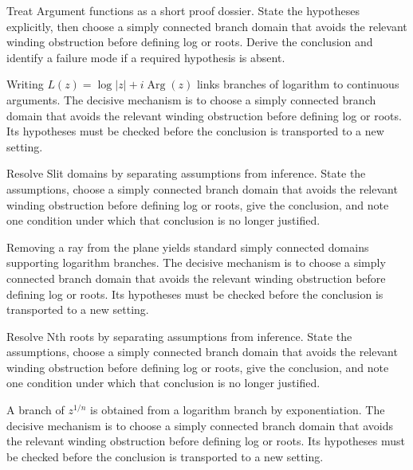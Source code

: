 \begin{problem}\label{prob:iv14-problem-03}
Treat Argument functions as a short proof dossier. State the hypotheses explicitly, then choose a simply connected branch domain that avoids the relevant winding obstruction before defining log or roots. Derive the conclusion and identify a failure mode if a required hypothesis is absent.
\end{problem}
\begin{solution}
Writing $L(z)=\log|z|+i\operatorname{Arg}(z)$ links branches of logarithm to continuous arguments. The decisive mechanism is to choose a simply connected branch domain that avoids the relevant winding obstruction before defining log or roots. Its hypotheses must be checked before the conclusion is transported to a new setting.
\end{solution}

\begin{problem}\label{prob:iv14-problem-04}
Resolve Slit domains by separating assumptions from inference. State the assumptions, choose a simply connected branch domain that avoids the relevant winding obstruction before defining log or roots, give the conclusion, and note one condition under which that conclusion is no longer justified.
\end{problem}
\begin{solution}
Removing a ray from the plane yields standard simply connected domains supporting logarithm branches. The decisive mechanism is to choose a simply connected branch domain that avoids the relevant winding obstruction before defining log or roots. Its hypotheses must be checked before the conclusion is transported to a new setting.
\end{solution}

\begin{problem}\label{prob:iv14-problem-05}
Resolve Nth roots by separating assumptions from inference. State the assumptions, choose a simply connected branch domain that avoids the relevant winding obstruction before defining log or roots, give the conclusion, and note one condition under which that conclusion is no longer justified.
\end{problem}
\begin{solution}
A branch of $z^{1/n}$ is obtained from a logarithm branch by exponentiation. The decisive mechanism is to choose a simply connected branch domain that avoids the relevant winding obstruction before defining log or roots. Its hypotheses must be checked before the conclusion is transported to a new setting.
\end{solution}

